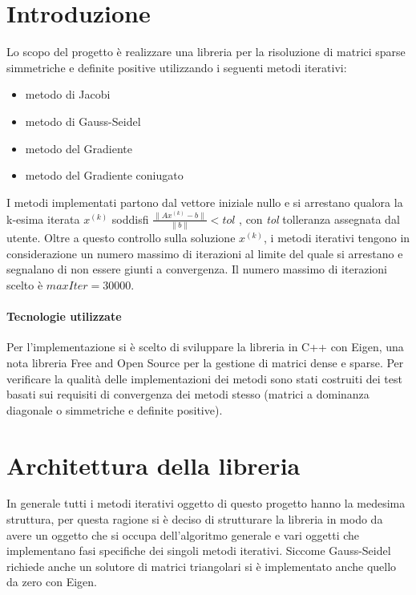 \documentclass[a4paper,11pt,oneside, table]{article}
\begin{document}
    \printindex
    \tableofcontents
    \renewcommand{\baselinestretch}{1.5}

\section{Introduzione}

Lo scopo del progetto \`e realizzare una libreria per la risoluzione di matrici sparse simmetriche e definite positive utilizzando i seguenti metodi iterativi:

\begin{itemize}
    \item metodo di Jacobi
    \item metodo di Gauss-Seidel
    \item metodo del Gradiente
    \item metodo del Gradiente coniugato
\end{itemize}

I metodi implementati partono dal vettore iniziale nullo e si arrestano qualora la k-esima iterata $x^{(k)}$ soddisfi $\frac{\parallel Ax^{(k)}-b \parallel} {\parallel b \parallel} < tol$ , con \textit{tol} tolleranza assegnata dal utente. Oltre a questo controllo sulla soluzione $x^{(k)}$, i metodi iterativi tengono in considerazione un numero massimo di iterazioni al limite del quale si arrestano e segnalano di non essere giunti a convergenza. Il numero massimo di iterazioni scelto \`e $maxIter = 30000$.

\paragraph{Tecnologie utilizzate}

Per l'implementazione si \`e scelto di sviluppare la libreria in C++ con Eigen, una nota libreria Free and Open Source per la gestione di  matrici dense e sparse. Per verificare la qualit\`a delle implementazioni dei metodi sono stati costruiti dei test basati sui requisiti di convergenza dei metodi stesso (matrici a dominanza diagonale o simmetriche e definite positive).

\section{Architettura della libreria}

In generale tutti i metodi iterativi oggetto di questo progetto hanno la medesima struttura, per questa ragione si \`e deciso di strutturare la libreria in modo da avere un oggetto che si occupa dell'algoritmo generale e vari oggetti che implementano fasi specifiche dei singoli metodi iterativi. Siccome Gauss-Seidel richiede anche un solutore di matrici triangolari si \`e implementato anche quello da zero con Eigen.
\end{document}
